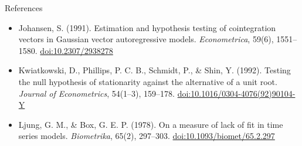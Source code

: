 \begin{frame}{References}
\begin{itemize}
    \item Johansen, S. (1991). Estimation and hypothesis testing of cointegration vectors in Gaussian vector autoregressive models. \textit{Econometrica}, 59(6), 1551--1580. \href{https://doi.org/10.2307/2938278}{doi:10.2307/2938278}
    \item Kwiatkowski, D., Phillips, P. C. B., Schmidt, P., \& Shin, Y. (1992). Testing the null hypothesis of stationarity against the alternative of a unit root. \textit{Journal of Econometrics}, 54(1--3), 159--178. \href{https://doi.org/10.1016/0304-4076(92)90104-Y}{doi:10.1016/0304-4076(92)90104-Y}
    \item Ljung, G. M., \& Box, G. E. P. (1978). On a measure of lack of fit in time series models. \textit{Biometrika}, 65(2), 297--303. \href{https://doi.org/10.1093/biomet/65.2.297}{doi:10.1093/biomet/65.2.297}
\end{itemize}
\end{frame}


